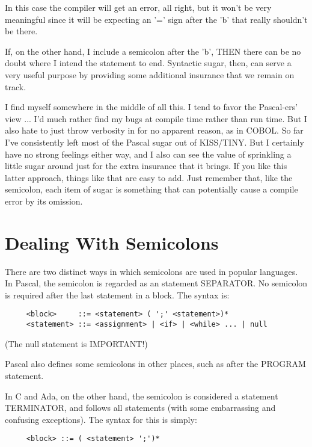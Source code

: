 In  this  case  the compiler will get an error, all right, but it won't be very meaningful  since  it will be expecting an '=' sign after the 'b' that really shouldn't be there.

If, on the other hand, I include a semicolon after the  'b', THEN there  can  be no doubt where I  intend  the  statement  to  end. Syntactic  sugar, then, can  serve  a  very  useful purpose  by providing some additional insurance that we remain on track.

I find  myself  somewhere  in  the middle of all this. I tend to favor the Pascal-ers' view ... I'd much rather find  my  bugs  at compile time rather than run time. But I also hate to just throw verbosity  in  for  no apparent reason, as in COBOL. So far I've consistently left most of the Pascal sugar out of KISS/TINY. But I certainly have no strong feelings either way, and  I  also  can see the value of sprinkling a little sugar around  just  for  the extra  insurance  that  it  brings. If  you like  this  latter approach, things like that are easy to add. Just  remember that, like  the semicolon, each item of sugar  is  something  that  can potentially cause a compile error by its omission.

\section{Dealing With Semicolons}

There  are  two  distinct  ways  in which semicolons are used  in popular  languages. In Pascal, the semicolon is regarded as an statement SEPARATOR. No semicolon  is  required  after  the last statement in a block. The syntax is:

\begin{verbatim}
     <block>     ::= <statement> ( ';' <statement>)*
     <statement> ::= <assignment> | <if> | <while> ... | null
\end{verbatim}

(The null statement is IMPORTANT!)

Pascal  also defines some semicolons in  other  places, such  as after the PROGRAM statement.

In  C  and  Ada, on the other hand, the semicolon is considered a statement TERMINATOR, and  follows  all  statements  (with  some embarrassing and confusing  exceptions). The syntax for this is simply:

\begin{verbatim}
     <block> ::= ( <statement> ';')*
\end{verbatim}


